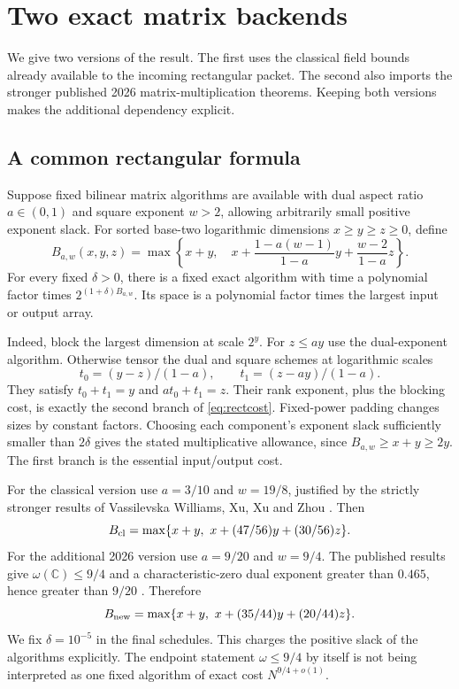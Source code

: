 \section{Two exact matrix backends}
\label{sec:backend}

We give two versions of the result. The first uses the classical field
bounds already available to the incoming rectangular packet. The second
also imports the stronger published 2026 matrix-multiplication theorems.
Keeping both versions makes the additional dependency explicit.

\subsection{A common rectangular formula}

Suppose fixed bilinear matrix algorithms are available with dual aspect
ratio $a\in(0,1)$ and square exponent $w>2$, allowing arbitrarily small
positive exponent slack. For sorted base-two logarithmic dimensions
$x\ge y\ge z\ge0$, define
\begin{equation}\label{eq:rectcost}
 B_{a,w}(x,y,z)=\max\left\{x+y,\quad
      x+\frac{1-a(w-1)}{1-a}y+\frac{w-2}{1-a}z\right\}.
\end{equation}
For every fixed $\delta>0$, there is a fixed exact algorithm with time a
polynomial factor times $2^{(1+\delta)B_{a,w}}$. Its space is a polynomial
factor times the largest input or output array.

Indeed, block the largest dimension at scale $2^y$. For $z\le ay$ use
the dual-exponent algorithm. Otherwise tensor the dual and square schemes
at logarithmic scales
\[
 t_0=(y-z)/(1-a),\qquad t_1=(z-ay)/(1-a).
\]
They satisfy $t_0+t_1=y$ and $at_0+t_1=z$. Their rank exponent, plus
the blocking cost, is exactly the second branch of \eqref{eq:rectcost}.
Fixed-power padding changes sizes by constant factors. Choosing each
component's exponent slack sufficiently smaller than $2\delta$ gives the
stated multiplicative allowance, since $B_{a,w}\ge x+y\ge2y$.
The first branch is the essential input/output cost.

For the classical version use $a=3/10$ and $w=19/8$, justified by the
strictly stronger results of Vassilevska Williams, Xu, Xu and Zhou
\cite{mmclassical}. Then
\begin{equation}\label{eq:classicalbackend}
 B_{\rm cl}=\max\{x+y,\ x+(47/56)y+(30/56)z\}.
\end{equation}
For the additional 2026 version use $a=9/20$ and $w=9/4$.
The published results give $\omega(\mathbb C)\le9/4$ and a
characteristic-zero dual exponent greater than $0.465$, hence greater than
$9/20$ \cite{mmnew,mmrect}. Therefore
\begin{equation}\label{eq:newbackend}
 B_{\rm new}=\max\{x+y,\ x+(35/44)y+(20/44)z\}.
\end{equation}
We fix $\delta=10^{-5}$ in the final schedules. This charges the
positive slack of the algorithms explicitly. The endpoint statement
$\omega\le9/4$ by itself is not being interpreted as one fixed algorithm
of exact cost $N^{9/4+o(1)}$.

